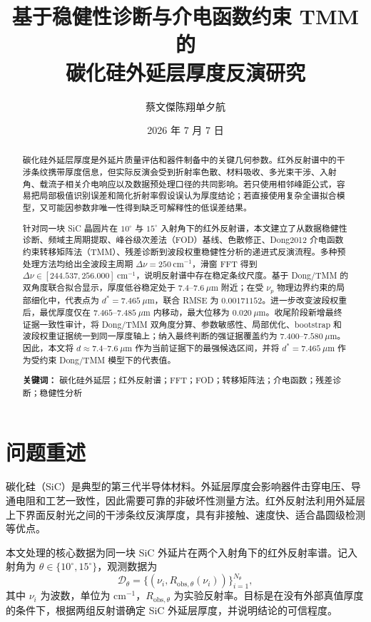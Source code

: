 \documentclass[UTF8,a4paper,12pt]{ctexart}
\title{\heiti 基于稳健性诊断与介电函数约束 TMM 的\\碳化硅外延层厚度反演研究}
\author{蔡文傑\quad 陈翔\quad 单夕航}
\date{2026 年 7 月 7 日}
\newcommand{\um}{\ensuremath{\mu\mathrm{m}}}
\newcommand{\cmone}{\ensuremath{\mathrm{cm}^{-1}}}
\begin{document}
\maketitle

\begin{abstract}
碳化硅外延层厚度是外延片质量评估和器件制备中的关键几何参数。红外反射谱中的干涉条纹携带厚度信息，但实际反演会受到折射率色散、材料吸收、多光束干涉、入射角、载流子相关介电响应以及数据预处理口径的共同影响。若只使用相邻峰距公式，容易把局部极值识别误差和简化折射率假设误认为厚度结论；若直接使用复杂全谱拟合模型，又可能因参数非唯一性得到缺乏可解释性的低误差结果。

针对同一块 SiC 晶圆片在 $10^\circ$ 与 $15^\circ$ 入射角下的红外反射谱，本文建立了从数据稳健性诊断、频域主周期提取、峰谷级次差法（FOD）基线、色散修正、Dong2012 介电函数约束转移矩阵法（TMM）、残差诊断到波段权重稳健性分析的递进式反演流程。多种预处理方法均给出全波段主周期 $\Delta\nu=250\ \cmone$，滑窗 FFT 得到 $\Delta\nu\in[244.537,256.000]\ \cmone$，说明反射谱中存在稳定条纹尺度。基于 Dong/TMM 的双角度联合拟合显示，厚度低谷稳定处于 $7.4\text{--}7.6\ \um$ 附近；在受 $\nu_p$ 物理边界约束的局部细化中，代表点为 $d^\ast=7.465\ \um$，联合 RMSE 为 $0.00171152$。进一步改变波段权重后，最优厚度仅在 $7.465\text{--}7.485\ \um$ 内移动，最大位移为 $0.020\ \um$。收尾阶段新增最终证据一致性审计，将 Dong/TMM 双角度分算、参数敏感性、局部优化、bootstrap 和波段权重证据统一到同一厚度轴上；纳入最终判断的强证据覆盖约为 $7.400\text{--}7.580\ \um$。因此，本文将 $d\approx7.4\text{--}7.6\ \um$ 作为当前证据下的最强候选区间，并将 $d^\ast=7.465\ \um$ 作为受约束 Dong/TMM 模型下的代表值。

\textbf{关键词：} 碳化硅外延层；红外反射谱；FFT；FOD；转移矩阵法；介电函数；残差诊断；稳健性分析
\end{abstract}

\section{问题重述}

碳化硅（SiC）是典型的第三代半导体材料。外延层厚度会影响器件击穿电压、导通电阻和工艺一致性，因此需要可靠的非破坏性测量方法。红外反射法利用外延层上下界面反射光之间的干涉条纹反演厚度，具有非接触、速度快、适合晶圆级检测等优点。

本文处理的核心数据为同一块 SiC 外延片在两个入射角下的红外反射率谱。记入射角为 $\theta\in\{10^\circ,15^\circ\}$，观测数据为
\begin{equation}
\mathcal D_\theta=
\{(\nu_i,R_{\mathrm{obs},\theta}(\nu_i))\}_{i=1}^{N_\theta},
\end{equation}
其中 $\nu_i$ 为波数，单位为 $\cmone$，$R_{\mathrm{obs},\theta}$ 为实验反射率。目标是在没有外部真值厚度的条件下，根据两组反射谱确定 SiC 外延层厚度，并说明结论的可信程度。
\end{document}
